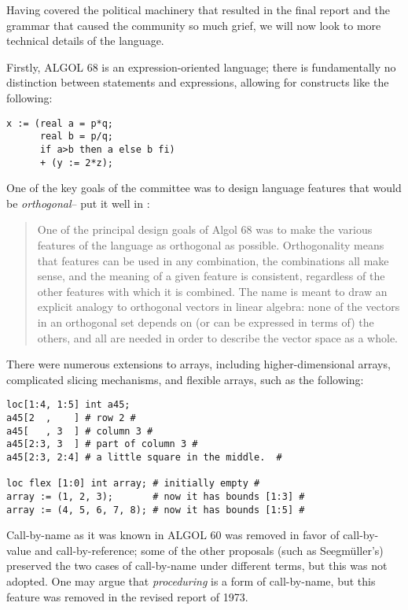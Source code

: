 Having covered the political machinery that resulted in the final report and
the grammar that caused the community so much grief,
we will now look to more technical details of the language.

Firstly, ALGOL 68 is an expression-oriented language;
there is fundamentally no distinction between statements and expressions,
allowing for constructs like the following:

\begin{lstlisting}[language=algol,frame=single]
x := (real a = p*q;
      real b = p/q;
      if a>b then a else b fi)
      + (y := 2*z);
\end{lstlisting}

One of the key goals of the committee was to design language features that
would be \textit{orthogonal}--\citeauthor{programming_language_pragmatics_2009}
put it well in \cite{programming_language_pragmatics_2009}:

\begin{quotation}
	One of the principal design goals of Algol 68 was to make the various features
	of the language as orthogonal as possible. Orthogonality means that features can
	be used in any combination, the combinations all make sense, and the meaning
	of a given feature is consistent, regardless of the other features with which it is
	combined. The name is meant to draw an explicit analogy to orthogonal vectors
	in linear algebra: none of the vectors in an orthogonal set depends on (or can
	be expressed in terms of) the others, and all are needed in order to describe the
	vector space as a whole.
\end{quotation}

There were numerous extensions to arrays, including higher-dimensional arrays,
complicated slicing mechanisms, and flexible arrays, such as the following:
\begin{lstlisting}[language=algol,frame=single]
loc[1:4, 1:5] int a45;
a45[2  ,    ] # row 2 #
a45[   , 3  ] # column 3 #
a45[2:3, 3  ] # part of column 3 #
a45[2:3, 2:4] # a little square in the middle.  #

loc flex [1:0] int array; # initially empty #
array := (1, 2, 3);       # now it has bounds [1:3] #
array := (4, 5, 6, 7, 8); # now it has bounds [1:5] #
\end{lstlisting}

Call-by-name as it was known in ALGOL 60 was removed in favor of
call-by-value and call-by-reference; some of the other proposals
(such as Seegm{\"u}ller's) preserved the two cases of call-by-name
under different terms, but this was not adopted.
One may argue that \textit{proceduring} is a form of call-by-name,
but this feature was removed in the revised report of 1973.

